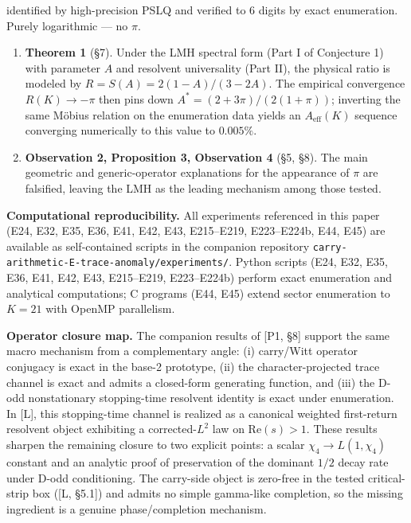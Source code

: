 \documentclass[
  11pt,
]{article}
\begin{document}
identified by high-precision PSLQ and verified to 6 digits by exact enumeration.
Purely logarithmic --- no \(\pi\).

\begin{enumerate}
\def\labelenumi{\arabic{enumi}.}
\setcounter{enumi}{1}
\item
  \textbf{Theorem 1} (§7). Under the LMH spectral form (Part I of Conjecture 1)
  with parameter \(A\) and resolvent universality (Part II), the physical ratio
  is modeled by \(R = S(A) = 2(1-A)/(3-2A)\). The empirical convergence
  \(R(K) \to -\pi\) then pins down \(A^{\ast} = (2+3\pi)/(2(1+\pi))\); inverting
  the same Möbius relation on the enumeration data yields an
  \(A_{\mathrm{eff}}(K)\) sequence converging numerically to this value to
  \(0.005\%\).
\item
  \textbf{Observation 2, Proposition 3, Observation 4} (§5, §8). The main
  geometric and generic-operator explanations for the appearance of \(\pi\) are
  falsified, leaving the LMH as the leading mechanism among those tested.
\end{enumerate}

\textbf{Computational reproducibility.} All experiments referenced in this paper
(E24, E32, E35, E36, E41, E42, E43, E215--E219, E223--E224b, E44, E45) are
available as self-contained scripts in the companion repository
\texttt{carry-arithmetic-E-trace-anomaly/experiments/}. Python scripts (E24,
E32, E35, E36, E41, E42, E43, E215--E219, E223--E224b) perform exact enumeration
and analytical computations; C programs (E44, E45) extend sector enumeration to
\(K = 21\) with OpenMP parallelism.

\textbf{Operator closure map.} The companion results of {[}P1, §8{]} support the
same macro mechanism from a complementary angle: (i) carry/Witt operator
conjugacy is exact in the base-2 prototype, (ii) the character-projected trace
channel is exact and admits a closed-form generating function, and (iii) the
D-odd nonstationary stopping-time resolvent identity is exact under enumeration.
In {[}L{]}, this stopping-time channel is realized as a canonical weighted
first-return resolvent object exhibiting a corrected-\(L^2\) law on
\(\mathrm{Re}(s) > 1\). These results sharpen the remaining closure to two
explicit points: a scalar \(\chi_4 \to L(1,\chi_4)\) constant and an analytic
proof of preservation of the dominant \(1/2\) decay rate under D-odd
conditioning. The carry-side object is zero-free in the tested critical-strip
box ({[}L, §5.1{]}) and admits no simple gamma-like completion, so the missing
ingredient is a genuine phase/completion mechanism.
\end{document}
